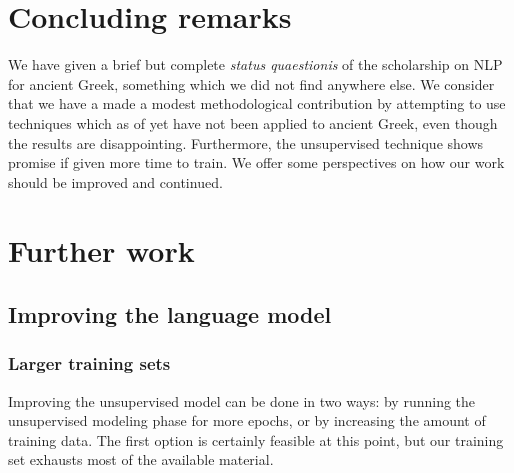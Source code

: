 

\section{Concluding remarks}
\label{sec:conclusion}
We have given a brief but complete \textit{status quaestionis} of the
scholarship on NLP for ancient Greek, something which we did not find
anywhere else. We consider that we have a made a modest methodological
contribution by attempting to use techniques which as of yet have not
been applied to ancient Greek, even though the results are
disappointing. Furthermore, the unsupervised technique shows promise
if given more time to train. We offer some perspectives on how our
work should be improved and continued.

\section{Further work}
\label{sec:further_work}
\subsection{Improving the language model}
\subsubsection{Larger training sets}
Improving the unsupervised model can be done in two ways: by running
the unsupervised modeling phase for more epochs, or by increasing the
amount of training data. The first option is certainly feasible at
this point, but our training set exhausts most of the available
material. 

